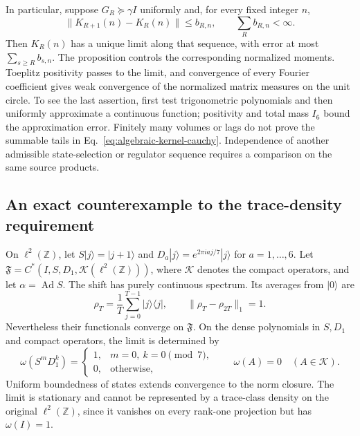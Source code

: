 In particular, suppose $G_R\succeq\gamma I$ uniformly and, for every fixed
integer $n$,
\begin{equation}
 \|K_{R+1}(n)-K_R(n)\|\leq b_{R,n},\qquad
 \sum_R b_{R,n}<\infty.
 \label{eq:algebraic-kernel-cauchy}
\end{equation}
Then $K_R(n)$ has a unique limit along that sequence, with error at most
$\sum_{s\geq R}b_{s,n}$. The proposition controls the corresponding
normalized moments. Toeplitz positivity passes to the limit, and convergence
of every Fourier coefficient gives weak convergence of the normalized
matrix measures on the unit circle. To see the last assertion, first test
trigonometric polynomials and then uniformly approximate a continuous
function; positivity and total mass $I_6$ bound the approximation error.
Finitely many volumes or lags do not prove the summable tails in
Eq.~\eqref{eq:algebraic-kernel-cauchy}. Independence of another admissible
state-selection or regulator sequence requires a comparison on the same
source products.

\subsection{An exact counterexample to the trace-density requirement}

On $\ell^2(\mathbb Z)$, let $S|j\rangle=|j+1\rangle$ and
$D_a|j\rangle=e^{2\pi iaj/7}|j\rangle$ for $a=1,\ldots,6$. Let
$\mathfrak F=C^*(I,S,D_1,\mathcal K(\ell^2(\mathbb Z)))$, where
$\mathcal K$ denotes the compact operators, and let $\alpha=\operatorname{Ad}S$.
The shift has purely continuous spectrum. Its averages from $|0\rangle$ are
\begin{equation}
 \rho_T=\frac1T\sum_{j=0}^{T-1}|j\rangle\langle j|,
 \qquad \|\rho_T-\rho_{2T}\|_1=1.
 \label{eq:algebraic-shift-trace-failure}
\end{equation}
Nevertheless their functionals converge on $\mathfrak F$. On the dense
polynomials in $S,D_1$ and compact operators, the limit is determined by
\[
 \omega(S^mD_1^k)=\begin{cases}1,&m=0,\ k=0\pmod7,\\0,&\text{otherwise},\end{cases}
 \qquad \omega(A)=0\quad(A\in\mathcal K).
\]
Uniform boundedness of states extends convergence to the norm closure.
The limit is stationary and cannot be represented by a trace-class density
on the original $\ell^2(\mathbb Z)$, since it vanishes on every rank-one
projection but has $\omega(I)=1$.

